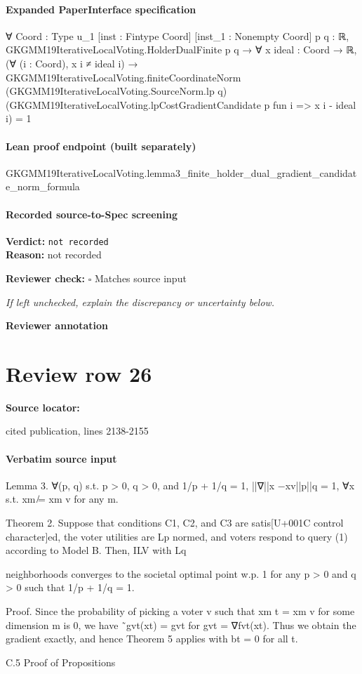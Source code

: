 \documentclass[10pt]{article}
\newcommand{\reviewerbox}{%
  \par\noindent\fbox{\parbox{0.96\linewidth}{\rule{0pt}{0.38in}}}\par
}
\newcommand{\reviewmatch}[1]{%
  \par\noindent\textbf{Reviewer check:} $\square$\; #1\par
  \noindent\emph{If left unchecked, explain the discrepancy or uncertainty below.}\par
}
\begin{document}
\paragraph{Expanded PaperInterface specification}
\begin{ReviewVerbatim}
∀ {Coord : Type u_1} [inst : Fintype Coord] [inst_1 : Nonempty Coord] {p q : ℝ},
  GKGMM19IterativeLocalVoting.HolderDualFinite p q →
    ∀ {x ideal : Coord → ℝ},
      (∀ (i : Coord), x i ≠ ideal i) →
        GKGMM19IterativeLocalVoting.finiteCoordinateNorm (GKGMM19IterativeLocalVoting.SourceNorm.lp q)
            (GKGMM19IterativeLocalVoting.lpCostGradientCandidate p fun i => x i - ideal i) =
          1
\end{ReviewVerbatim}

\paragraph{Lean proof endpoint (built separately)}\begin{ReviewVerbatim}
GKGMM19IterativeLocalVoting.lemma3_finite_holder_dual_gradient_candidate_norm_formula
\end{ReviewVerbatim}

\paragraph{Recorded source-to-Spec screening}
\textbf{Verdict:} \texttt{not recorded}
\\
\textbf{Reason:} not recorded
\reviewmatch{Matches source input}
\noindent\textbf{Reviewer annotation}\par
\reviewerbox
\clearpage
\hypertarget{source-claim-b6876f8d9704eca1}{}
\section*{Review row 26}
\textbf{Source locator:} {\footnotesize\raggedright cited publication, lines 2138-\allowbreak{}2155\par}
\paragraph{Verbatim source input}
\begin{ReviewVerbatim}
Lemma 3. ∀(p, q) s.t. p > 0, q > 0, and 1/p + 1/q = 1, ||∇||x −xv||p||q = 1, ∀x s.t.
xm ̸= xm
v for any m.

Theorem 2. Suppose that conditions C1, C2, and C3 are satis[U+001C control character]ed, the voter utilities are
Lp normed, and voters respond to query (1) according to Model B. Then, ILV with Lq

neighborhoods converges to the societal optimal point w.p. 1 for any p > 0 and q > 0 such
that 1/p + 1/q = 1.

Proof. Since the probability of picking a voter v such that xm
t = xm
v for some dimension m
is 0, we have ˜gvt(xt) = gvt for gvt = ∇fvt(xt). Thus we obtain the gradient exactly, and
hence Theorem 5 applies with bt = 0 for all t.

C.5 Proof of Propositions
\end{ReviewVerbatim}
\end{document}
